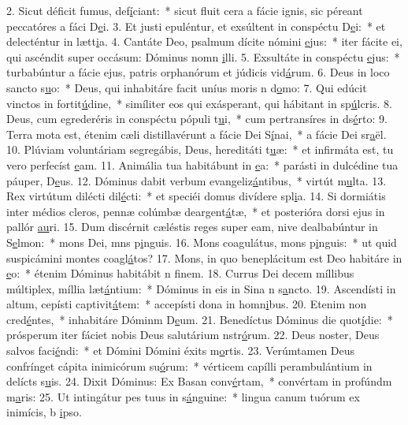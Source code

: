 2. Sicut déficit fumus, def\uline{í}ciant:~* sicut fluit cera a fácie ignis, sic péreant peccatóres a fáci D\uline{e}i.
3. Et justi epuléntur, et exsúltent in conspéctu D\uline{e}i:~* et delecténtur in lætt\uline{i}a.
4. Cantáte Deo, psalmum dícite nómini \uline{e}jus:~* iter fácite ei, qui ascéndit super occásum: Dóminus nomn \uline{i}lli.
5. Exsultáte in conspéctu \uline{e}jus:~* turbabúntur a fácie ejus, patris orphanórum et júdicis vid\uline{á}rum.
6. Deus in loco sancto s\uline{u}o:~* Deus, qui inhabitáre facit uníus moris n d\uline{o}mo:
7. Qui edúcit vinctos in fortit\uline{ú}dine,~* simíliter eos qui exásperant, qui hábitant in sp\uline{ú}lcris.
8. Deus, cum egrederéris in conspéctu pópuli t\uline{u}i,~* cum pertransíres in ds\uline{é}rto:
9. Terra mota est, étenim cæli distillavérunt a fácie Dei S\uline{í}nai,~* a fácie Dei sr\uline{a}ël.
10. Plúviam voluntáriam segregábis, Deus, hereditáti t\uline{u}æ:~* et infirmáta est, tu vero perfecíst \uline{e}am.
11. Animália tua habitábunt in \uline{e}a:~* parásti in dulcédine tua páuper, D\uline{e}us.
12. Dóminus dabit verbum evangeliz\uline{á}ntibus,~* virtút m\uline{u}lta.
13. Rex virtútum dilécti dil\uline{é}cti:~* et speciéi domus divídere spl\uline{i}a.
14. Si dormiátis inter médios cleros, pennæ colúmbæ deargent\uline{á}tæ,~* et posterióra dorsi ejus in pallór \uline{au}ri.
15. Dum discérnit cæléstis reges super eam, nive dealbabúntur in S\uline{e}lmon:~* mons Dei, mns p\uline{i}nguis.
16. Mons coagulátus, mons p\uline{i}nguis:~* ut quid suspicámini montes coagl\uline{á}tos?
17. Mons, in quo beneplácitum est Deo habitáre in \uline{e}o:~* étenim Dóminus habitábit n f\uline{i}nem.
18. Currus Dei decem míllibus múltiplex, míllia læt\uline{á}ntium:~* Dóminus in eis in Sina n s\uline{a}ncto.
19. Ascendísti in altum, cepísti captivit\uline{á}tem:~* accepísti dona in homn\uline{i}bus.
20. Etenim non cred\uline{é}ntes,~* inhabitáre Dóminm D\uline{e}um.
21. Benedíctus Dóminus die quot\uline{í}die:~* prósperum iter fáciet nobis Deus salutárium nstr\uline{ó}rum.
22. Deus noster, Deus salvos faci\uline{é}ndi:~* et Dómini Dómini éxits m\uline{o}rtis.
23. Verúmtamen Deus confrínget cápita inimicórum su\uline{ó}rum:~* vérticem capílli perambulántium in delícts s\uline{u}is.
24. Dixit Dóminus: Ex Basan conv\uline{é}rtam,~* convértam in profúndm m\uline{a}ris:
25. Ut intingátur pes tuus in s\uline{á}nguine:~* lingua canum tuórum ex inimícis, b \uline{i}pso.
